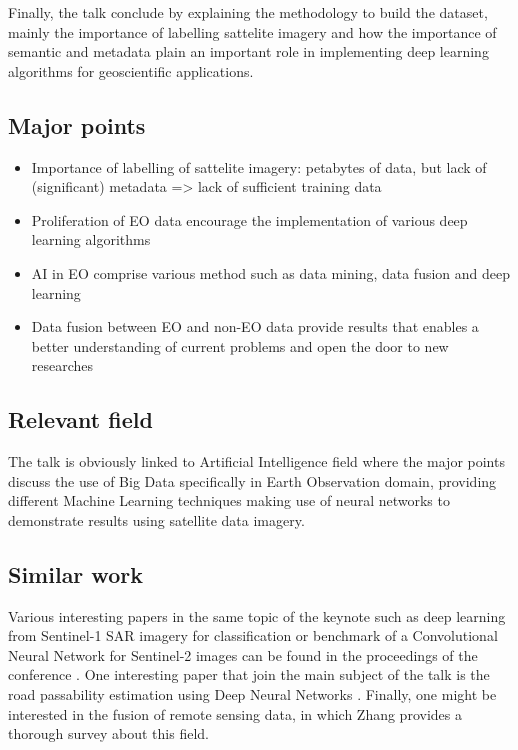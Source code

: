 \documentclass[11pt,a4paper]{article}
\begin{document}
Finally, the talk conclude by explaining the methodology to build the dataset, mainly the importance of labelling sattelite imagery and how the importance of semantic and metadata plain an important role in implementing deep learning algorithms for geoscientific applications.

\subsection{Major points}

\begin{itemize}
  \item Importance of labelling of sattelite imagery: petabytes of data, but lack of (significant) metadata => lack of sufficient training data
  \item Proliferation of EO data encourage the implementation of various deep learning algorithms
  \item AI in EO comprise various method such as data mining, data fusion and deep learning
  \item Data fusion between EO and non-EO data provide results that enables a better understanding of current problems and open the door to new researches
\end{itemize}



\subsection{Relevant field}

The talk is obviously linked to Artificial Intelligence field where the major points discuss the use of Big Data specifically in Earth Observation domain, providing different Machine Learning techniques making use of neural networks to demonstrate results using satellite data imagery.

\subsection{Similar work}

Various interesting papers in the same topic of the keynote such as deep learning from Sentinel-1 SAR imagery for classification or benchmark of a Convolutional Neural Network for Sentinel-2 images can be found in the proceedings of the conference \cite{union_proceedings_2019}. One interesting paper that join the main subject of the talk is the road passability estimation using Deep Neural Networks \cite{moumtzidou_road_2019}. Finally, one might be interested in the fusion of remote sensing data, in which Zhang provides a thorough \cite{zhang_multi-source_2010} survey about this field.
\end{document}
